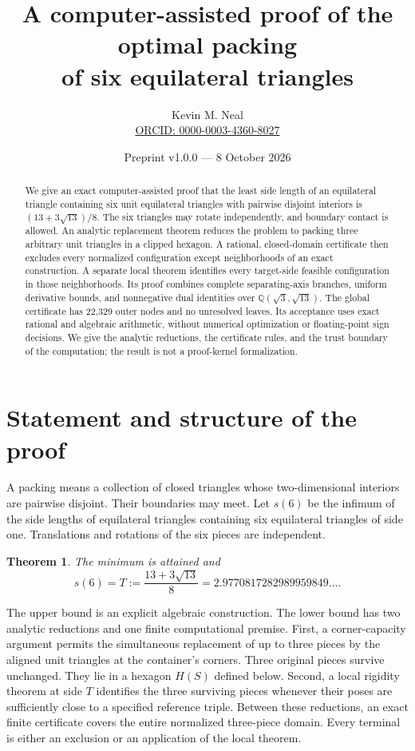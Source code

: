 \documentclass[11pt]{article}
\title{A computer-assisted proof of the optimal packing\\of six equilateral triangles}
\author{Kevin M. Neal\\[3pt]\footnotesize\href{https://orcid.org/0000-0003-4360-8027}{ORCID: 0000-0003-4360-8027}}
\date{Preprint v1.0.0 --- 8 October 2026}
\newtheorem{theorem}{Theorem}[section]
\begin{document}
\maketitle
\begin{abstract}
We give an exact computer-assisted proof that the least side length of an equilateral triangle containing six unit equilateral triangles with pairwise disjoint interiors is $(13+3\sqrt{13})/8$. The six triangles may rotate independently, and boundary contact is allowed. An analytic replacement theorem reduces the problem to packing three arbitrary unit triangles in a clipped hexagon. A rational, closed-domain certificate then excludes every normalized configuration except neighborhoods of an exact construction. A separate local theorem identifies every target-side feasible configuration in those neighborhoods. Its proof combines complete separating-axis branches, uniform derivative bounds, and nonnegative dual identities over $\mathbb Q(\sqrt3,\sqrt{13})$. The global certificate has 22,329 outer nodes and no unresolved leaves. Its acceptance uses exact rational and algebraic arithmetic, without numerical optimization or floating-point sign decisions. We give the analytic reductions, the certificate rules, and the trust boundary of the computation; the result is not a proof-kernel formalization.
\end{abstract}

\section{Statement and structure of the proof}\label{sec:statement}

A packing means a collection of closed triangles whose two-dimensional interiors are pairwise disjoint. Their boundaries may meet. Let $s(6)$ be the infimum of the side lengths of equilateral triangles containing six equilateral triangles of side one. Translations and rotations of the six pieces are independent.

\begin{theorem}\label{thm:main}
The minimum is attained and
\[
 s(6)=T:=\frac{13+3\sqrt{13}}8
       =2.9770817282989959849\ldots.
\]
\end{theorem}

The upper bound is an explicit algebraic construction. The lower bound has two analytic reductions and one finite computational premise. First, a corner-capacity argument permits the simultaneous replacement of up to three pieces by the aligned unit triangles at the container's corners. Three original pieces survive unchanged. They lie in a hexagon $H(S)$ defined below. Second, a local rigidity theorem at side $T$ identifies the three surviving pieces whenever their poses are sufficiently close to a specified reference triple. Between these reductions, an exact finite certificate covers the entire normalized three-piece domain. Every terminal is either an exclusion or an application of the local theorem.
\end{document}
